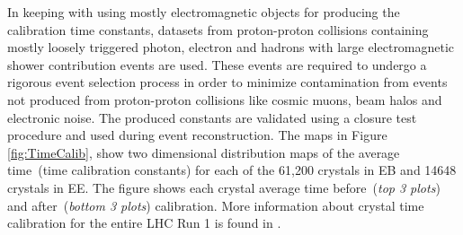 \newline
In keeping with using mostly electromagnetic objects for producing the calibration time constants, datasets from proton-proton collisions containing mostly loosely triggered photon, electron and hadrons with large electromagnetic shower contribution events are used.
These events are required to undergo a rigorous event selection process in order to minimize contamination from events not produced from proton-proton collisions like cosmic muons, beam halos and electronic noise. The produced constants are validated using a closure test procedure and used during event reconstruction.
The maps in Figure \ref{fig:TimeCalib}, show two dimensional distribution maps of the average time~(time calibration constants) for each of the 61,200 crystals in EB and 14648 crystals in EE. The figure shows each crystal average time before~(\textit{top 3 plots}) and after~(\textit{bottom 3 plots}) calibration. More information about crystal time calibration for the entire LHC Run 1 is found in \cite{ECALCAL}.
